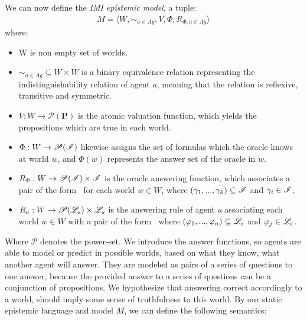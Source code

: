 We can now define the \textit{IMI epistemic model}, a tuple:
\begin{align}
	M = \langle W, \sim_{a\in Ag}, V, \Phi, R_{\Phi, a\in Ag}\rangle
\end{align}
where:
\begin{itemize}
	\setlength\itemsep{-0.4em}
	\item W is non empty set of worlds.
	\item $\sim_{a\in Ag} \subseteq W \times W$ is a binary equivalence relation representing the indistinguishability relation of agent $a$, meaning that the relation is reflexive, transitive and symmetric.
	\item $V : W \rightarrow \mathscr{P}(\mathbf{P})$ is the atomic valuation function, which yields the propositions which are true in each world. 
	\item $\Phi : W \rightarrow \mathscr{P}(\mathscr{I}) $ likewise assigns the set of formulas which the oracle knows at world $w$, and $\Phi(w)$ represents the answer set of the oracle in $w$.
	\item $R_{\Phi} : W \rightarrow \mathscr{P}(\mathscr{I}) \times \mathscr{I}$ is the oracle answering function, which associates a pair of the form \oset $\:$ for each world $w \in W$, where $(\gamma_1,...,\gamma_k) \subseteq \mathscr{I}$ and $\gamma_i \in \mathscr{I}$.
	\item $R_a : W \rightarrow \mathscr{P}(\mathscr{L}_s) \times \mathscr{L}_s$ is the answering rule of agent \textit{a} associating each world $w \in W$ with a pair of the form \aset $\:$ where $(\varphi_1,...,\varphi_n) \subseteq \mathscr{L}_s$ and $\varphi_j \in \mathscr{L}_s$.
\end{itemize}
Where $\mathscr{P}$ denotes the power-set. We introduce the answer functions, so agents are able to model or predict in possible worlds, based on what they know, what another agent will answer. They are modeled as pairs of a series of questions to one answer, because the provided answer to a series of questions can be a conjunction of propositions. We hypothesize that answering correct accordingly to a world, should imply some sense of truthfulness to this world. By our static epistemic language \staticlang\: and model $M$, we can define the following semantics:


